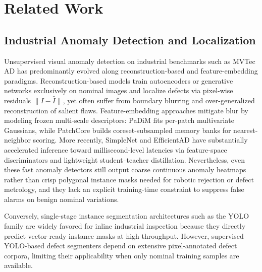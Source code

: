 \section{Related Work}
\label{sec:related_work}

\subsection{Industrial Anomaly Detection and Localization}
Unsupervised visual anomaly detection on industrial benchmarks such as MVTec AD \cite{bergmann2019mvtec, czimmermann2020visual} has predominantly evolved along reconstruction-based and feature-embedding paradigms. Reconstruction-based models train autoencoders or generative networks exclusively on nominal images and localize defects via pixel-wise residuals $\|I - \hat{I}\|$, yet often suffer from boundary blurring and over-generalized reconstruction of salient flaws. Feature-embedding approaches mitigate blur by modeling frozen multi-scale descriptors: PaDiM \cite{defard2021padim} fits per-patch multivariate Gaussians, while PatchCore \cite{roth2022towards} builds coreset-subsampled memory banks for nearest-neighbor scoring. More recently, SimpleNet \cite{liu2023simplenet} and EfficientAD \cite{batzner2024efficientad} have substantially accelerated inference toward millisecond-level latencies via feature-space discriminators and lightweight student--teacher distillation. Nevertheless, even these fast anomaly detectors still output coarse continuous anomaly heatmaps rather than crisp polygonal instance masks needed for robotic rejection or defect metrology, and they lack an explicit training-time constraint to suppress false alarms on benign nominal variations.

Conversely, single-stage instance segmentation architectures such as the YOLO family \cite{ultralytics2024yolo11} are widely favored for inline industrial inspection because they directly predict vector-ready instance masks at high throughput. However, supervised YOLO-based defect segmenters depend on extensive pixel-annotated defect corpora, limiting their applicability when only nominal training samples are available.

